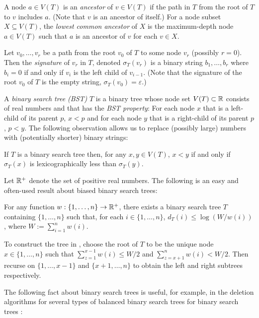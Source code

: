 \documentclass[kpfonts]{patmorin}
\begin{document}
A node $a\in V(T)$ is an \emph{ancestor} of $v\in V(T)$ if the path in $T$ from the root of $T$ to $v$ includes $a$.  (Note that $v$ is an ancestor of itself.) For a node subset $X\subseteq V(T)$, the \emph{lowest common ancestor} of $X$ is the maximum-depth node $a\in V(T)$ such that $a$ is an ancestor of $v$ for each $v\in X$.

Let $v_0,\ldots,v_{r}$ be a path from the root $v_0$ of $T$ to some node $v_r$ (possibly $r=0$).  Then the \emph{signature} of $v_r$ in $T$, denoted $\sigma_T(v_r)$ is a binary string $b_1,\ldots,b_r$ where $b_i=0$ if and only if $v_{i}$ is the left child of $v_{i-1}$.  (Note that the signature of the root $v_0$ of $T$ is the empty string,  $\sigma_T(v_0)=\varepsilon$.)

A \emph{binary search tree (BST)} $T$ is a binary tree  whose node set $V(T)\subset\mathbb{R}$ consists of real numbers and that has the \emph{BST property}:  For each node $x$ that is a left-child of its parent $p$, $x<p$ and for each node $y$ that is a right-child of its parent $p$, $p<y$.  The following observation allows us to replace (possibly large) numbers with (potentially shorter) binary strings:

\begin{obs}
  If $T$ is a binary search tree then, for any $x,y\in V(T)$, $x<y$ if and only if $\sigma_T(x)$ is lexicographically less than $\sigma_T(y)$.
\end{obs}

Let $\mathbb{R}^+$ denote the set of positive real numbers. The following is an easy and often-used result about biased binary search trees:

\begin{lem}
  For any function $w:\{1,\ldots,n\}\to\mathbb{R}^+$, there exists a binary search tree $T$ containing $\{1,\ldots,n\}$ such that, for each $i\in\{1,\ldots,n\}$, $d_T(i)\le\log(W/w(i))$, where $W:=\sum_{i=1}^n w(i)$.
\end{lem}

To construct the tree in , choose the root of $T$ to be the unique node $x\in\{1,\ldots,n\}$ such that $\sum_{z=1}^{x-1} w(i)\le W/2$ and $\sum_{z=x+1}^{n} w(i)< W/2$.  Then recurse on $\{1,\ldots,x-1\}$ and $\{x+1,\ldots,n\}$ to obtain the left and right subtrees respectively.

The following fact about binary search trees is useful, for example, in the deletion algorithms for several types of balanced binary search trees for binary search trees \cite[Section~6.2.3]{morin:open}:
\end{document}
